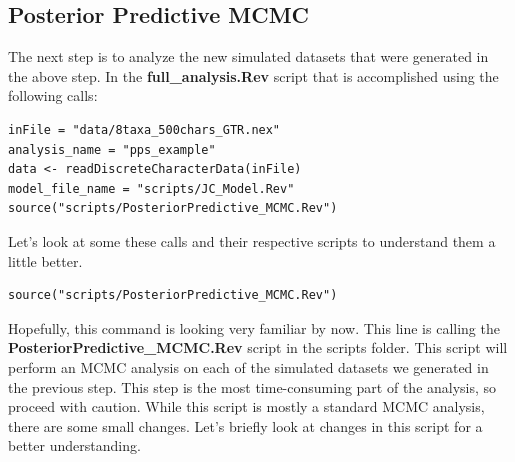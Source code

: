 \subsection{Posterior Predictive MCMC}

The next step is to analyze the new simulated datasets that were generated in the above step. In the 
\textbf{full\_analysis.Rev} script that is accomplished using the following calls:
{\tt \begin{snugshade*}
\begin{lstlisting}
inFile = "data/8taxa_500chars_GTR.nex"
analysis_name = "pps_example"
data <- readDiscreteCharacterData(inFile)
model_file_name = "scripts/JC_Model.Rev"
source("scripts/PosteriorPredictive_MCMC.Rev")
\end{lstlisting}
\end{snugshade*}}

Let's look at some these calls and their respective scripts to understand them a little better. 

{\tt \begin{snugshade*}
\begin{lstlisting}
source("scripts/PosteriorPredictive_MCMC.Rev")
\end{lstlisting}
\end{snugshade*}}

Hopefully, this command is looking very familiar by now. This line is calling the 
\textbf{PosteriorPredictive\_MCMC.Rev} script in the scripts folder. This script will perform an MCMC 
analysis on each of the simulated datasets we generated in the previous step. This step is the most 
time-consuming part of the analysis, so proceed with caution. While this script is mostly a standard 
MCMC analysis, there are some small changes. Let's briefly look at changes in this script for a better 
understanding.

